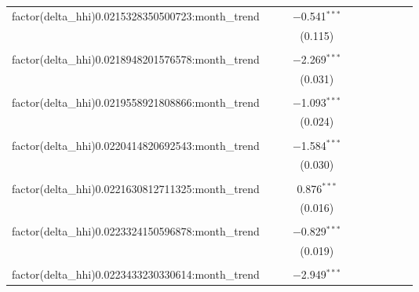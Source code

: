\begin{table}[H]
{\begin{tabular}{@{\extracolsep{5pt}}lccccccccc}
  factor(delta\_hhi)0.0215328350500723:month\_trend &  &  & $-$0.541$^{***}$ &  &  &  &  &  &  \\  

   &  &  & (0.115) &  &  &  &  &  &  \\  

   & & & & & & & & & \\  

  factor(delta\_hhi)0.0218948201576578:month\_trend &  &  & $-$2.269$^{***}$ &  &  &  &  &  &  \\  

   &  &  & (0.031) &  &  &  &  &  &  \\  

   & & & & & & & & & \\  

  factor(delta\_hhi)0.0219558921808866:month\_trend &  &  & $-$1.093$^{***}$ &  &  &  &  &  &  \\  

   &  &  & (0.024) &  &  &  &  &  &  \\  

   & & & & & & & & & \\  

  factor(delta\_hhi)0.0220414820692543:month\_trend &  &  & $-$1.584$^{***}$ &  &  &  &  &  &  \\  

   &  &  & (0.030) &  &  &  &  &  &  \\  

   & & & & & & & & & \\  

  factor(delta\_hhi)0.0221630812711325:month\_trend &  &  & 0.876$^{***}$ &  &  &  &  &  &  \\  

   &  &  & (0.016) &  &  &  &  &  &  \\  

   & & & & & & & & & \\  

  factor(delta\_hhi)0.0223324150596878:month\_trend &  &  & $-$0.829$^{***}$ &  &  &  &  &  &  \\  

   &  &  & (0.019) &  &  &  &  &  &  \\  

   & & & & & & & & & \\  

  factor(delta\_hhi)0.0223433230330614:month\_trend &  &  & $-$2.949$^{***}$ &  &  &  &  &  &  \\  


\end{tabular}}
\end{table}
